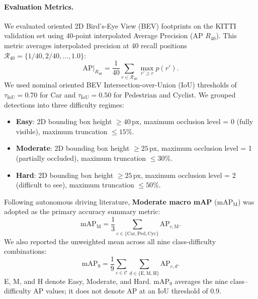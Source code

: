 \paragraph{Evaluation Metrics.}
We evaluated oriented 2D Bird's-Eye View (BEV) footprints on the KITTI validation set using 40-point interpolated Average Precision (AP $R_{40}$). This metric averages interpolated precision at 40 recall positions $\mathcal{R}_{40} = \{1/40, 2/40, \dots, 1.0\}$:
\begin{equation}
    \mathrm{AP}|_{R_{40}} = \frac{1}{40} \sum_{r \in \mathcal{R}_{40}} \max_{r' \ge r} p(r').
\end{equation}
We used nominal oriented BEV Intersection-over-Union (IoU) thresholds of $\tau_{\mathrm{IoU}} = 0.70$ for Car and $\tau_{\mathrm{IoU}} = 0.50$ for Pedestrian and Cyclist. We grouped detections into three difficulty regimes:
\begin{itemize}
    \item \textbf{Easy}: 2D bounding box height $\ge 40\,\text{px}$, maximum occlusion level = 0 (fully visible), maximum truncation $\le 15\%$.
    \item \textbf{Moderate}: 2D bounding box height $\ge 25\,\text{px}$, maximum occlusion level = 1 (partially occluded), maximum truncation $\le 30\%$.
    \item \textbf{Hard}: 2D bounding box height $\ge 25\,\text{px}$, maximum occlusion level = 2 (difficult to see), maximum truncation $\le 50\%$.
\end{itemize}
Following autonomous driving literature, \textbf{Moderate macro mAP} ($\mathrm{mAP}_{\mathrm{M}}$) was adopted as the primary accuracy summary metric:
\begin{equation}
    \mathrm{mAP}_{\mathrm{M}} = \frac{1}{3} \sum_{c \in \{\mathrm{Car}, \mathrm{Ped}, \mathrm{Cyc}\}} \mathrm{AP}_{c, \mathrm{M}}.
\end{equation}
We also reported the unweighted mean across all nine class-difficulty combinations:
\begin{equation}
    \mathrm{mAP}_{9} = \frac{1}{9} \sum_{c \in \mathcal{C}} \sum_{d \in \{\mathrm{E}, \mathrm{M}, \mathrm{H}\}} \mathrm{AP}_{c, d}.
\end{equation}
E, M, and H denote Easy, Moderate, and Hard. $\mathrm{mAP}_{9}$ averages the nine class--difficulty AP values; it does not denote AP at an IoU threshold of 0.9.


